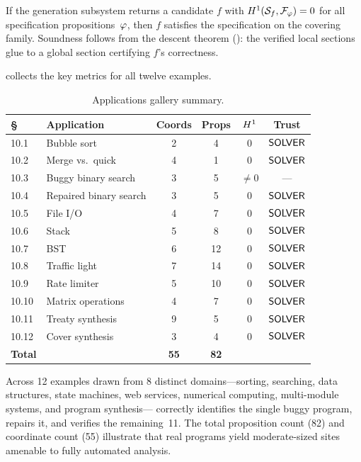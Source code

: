 \begin{theorem}\label{thm:synthesis}
If the generation subsystem returns a candidate $f$ with
$H^{1}(\mathcal{S}_f, \mathcal{F}_\varphi) = 0$ for all specification
propositions~$\varphi$, then $f$ satisfies the specification on
the covering family.  Soundness follows from the descent theorem
(\cf {}): the verified local sections glue to a
global section certifying $f$'s correctness.
\end{theorem}

\bigskip

\begin{remark}
 collects the key metrics for all twelve
examples.
\end{remark}

\begin{table}[H]
\centering
\caption{Applications gallery summary.}
\label{tab:gallery-summary}
\begin{tabular}{@{}llcccc@{}}
\toprule
\textbf{\S} & \textbf{Application} & \textbf{Coords} & \textbf{Props}
  & $H^{1}$ & \textbf{Trust} \\
\midrule
10.1 & Bubble sort         & 2  & 4  & 0 & $\mathsf{SOLVER}$ \\
10.2 & Merge vs.\ quick    & 4  & 1  & 0 & $\mathsf{SOLVER}$ \\
10.3 & Buggy binary search & 3  & 5  & $\neq 0$ & --- \\
10.4 & Repaired binary search & 3 & 5 & 0 & $\mathsf{SOLVER}$ \\
10.5 & File I/O            & 4  & 7  & 0 & $\mathsf{SOLVER}$ \\
10.6 & Stack               & 5  & 8  & 0 & $\mathsf{SOLVER}$ \\
10.7 & BST                 & 6  & 12 & 0 & $\mathsf{SOLVER}$ \\
10.8 & Traffic light       & 7  & 14 & 0 & $\mathsf{SOLVER}$ \\
10.9 & Rate limiter        & 5  & 10 & 0 & $\mathsf{SOLVER}$ \\
10.10 & Matrix operations  & 4  & 7  & 0 & $\mathsf{SOLVER}$ \\
10.11 & Treaty synthesis   & 9  & 5  & 0 & $\mathsf{SOLVER}$ \\
10.12 & Cover synthesis    & 3  & 4  & 0 & $\mathsf{SOLVER}$ \\
\midrule
\textbf{Total} & & \textbf{55} & \textbf{82} & & \\
\bottomrule
\end{tabular}
\end{table}

Across 12 examples drawn from 8 distinct domains---sorting,
searching, data structures, state machines, web services, numerical
computing, multi-module systems, and program synthesis---\JuGeo{}
correctly identifies the single buggy program, repairs it, and
verifies the remaining~11.  The total proposition count (82) and
coordinate count (55) illustrate that real programs yield
moderate-sized sites amenable to fully automated analysis.
